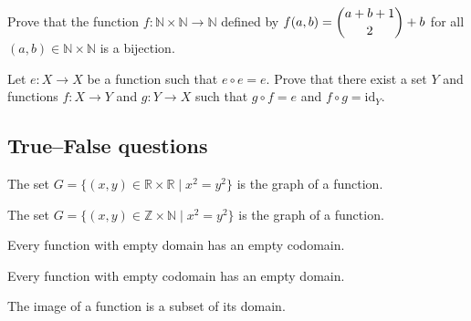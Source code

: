\begin{chapex}
Prove that the function $f : \mathbb{N} \times \mathbb{N} \to \mathbb{N}$ defined by $f(a,b) = \dbinom{a+b+1}{2} + b$ for all $(a,b) \in \mathbb{N} \times \mathbb{N}$ is a bijection.
\end{chapex}

\begin{chapex}
Let $e : X \to X$ be a function such that $e \circ e = e$. Prove that there exist a set $Y$ and functions $f : X \to Y$ and $g : Y \to X$ such that $g \circ f = e$ and $f \circ g = \mathrm{id}_Y$.
\end{chapex}

\subsection*{True--False questions}


\begin{chapex} %
\label{cqFunctionsTFBegin}
The set $G = \{ (x,y) \in \mathbb{R} \times \mathbb{R} \mid x^2=y^2 \}$ is the graph of a function.
\end{chapex}

\begin{chapex} %
The set $G = \{ (x,y) \in \mathbb{Z}\times \mathbb{N} \mid x^2=y^2 \}$ is the graph of a function.
\end{chapex}

\begin{chapex} %
Every function with empty domain has an empty codomain.
\end{chapex}

\begin{chapex} %
Every function with empty codomain has an empty domain.
\end{chapex}

\begin{chapex} %
The image of a function is a subset of its domain.
\end{chapex}

